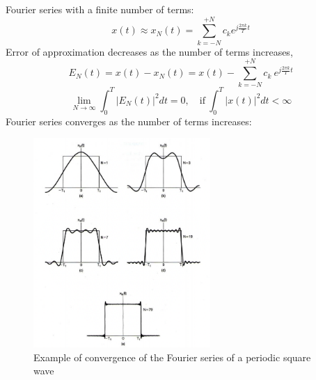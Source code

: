 \begin{tcolorbox}[breakable]
Fourier series with a finite number of terms:
\[ x(t) \approx x_{N}(t) = \sum_{k=-N}^{+N} c_{k} e^{j\frac{2\pi k}{T}t} \]
Error of approximation decreases as the number of terms increases,
\[ E_{N}(t) = x(t)-x_{N}(t) = x(t)- \sum_{k=-N}^{+N} c_{k} \ e^{j\frac{2\pi k}{T}t} \]
\[ \lim_{N \to \infty} \int_{0}^{T} \lvert E_{N}(t) \rvert^{2} dt = 0, \quad \text{if} \ \int_{0}^{T} \lvert x(t) \rvert^{2} dt < \infty \] 
Fourier series converges as the number of terms increases:
\begin{figure}[H]
    \centering
    \includegraphics[width = 0.6\textwidth]{images/convergence}
    \caption{Example of convergence of the Fourier series of a periodic square wave} 
\end{figure}
\end{tcolorbox}
